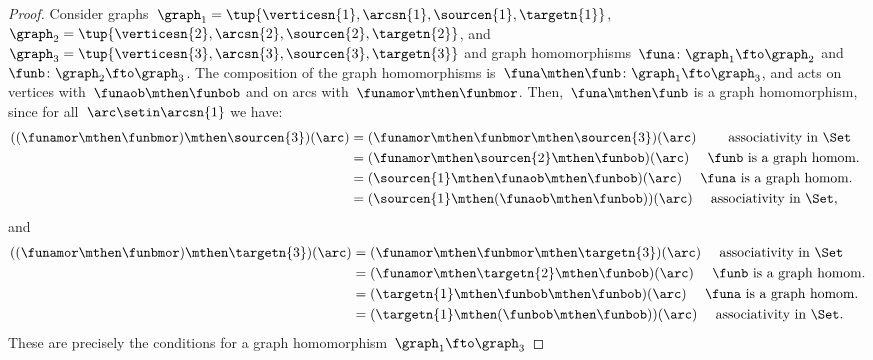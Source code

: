 \begin{proof}
    Consider graphs~$\graph_1=\tup{\verticesn{1},\arcsn{1},\sourcen{1},\targetn{1}}$,~$\graph_2=\tup{\verticesn{2},\arcsn{2},\sourcen{2},\targetn{2}}$, and~$\graph_3=\tup{\verticesn{3},\arcsn{3},\sourcen{3},\targetn{3}}$ and
    graph homomorphisms~$\funa \colon \graph_1 \fto \graph_2$ and~$\funb \colon \graph_2 \fto \graph_3$.
    The composition of the graph homomorphisms is~$\funa\mthen \funb \colon \graph_1 \fto \graph_3$, and acts on vertices with~$\funaob \mthen \funbob$ and on arcs with~$\funamor \mthen \funbmor$.
    Then,~$\funa\mthen \funb$ is a graph homomorphism, since for all~$\arc \setin \arcsn{1}$ we have:
    \begin{equation*}
        \begin{aligned}
            ((\funamor\mthen \funbmor) \mthen \sourcen{3})(\arc) & =(\funamor\mthen \funbmor \mthen \sourcen{3})(\arc) \qquad \text{ associativity in \Set} \\
                                                                 & =(\funamor\mthen \sourcen{2} \mthen \funbob)(\arc) \quad \text{ $\funb$ is a graph homom.
            } \\
                                                                 & =(\sourcen{1} \mthen \funaob\mthen \funbob)(\arc) \quad \text{ $\funa$ is a graph homom.} \\
                                                                 & =(\sourcen{1} \mthen (\funaob\mthen \funbob))(\arc) \quad \text{ associativity in \Set},
        \end{aligned}
    \end{equation*}
    and
    \begin{equation*}
        \begin{aligned}
            ((\funamor \mthen \funbmor) \mthen \targetn{3})(\arc) & =(\funamor \mthen \funbmor \mthen \targetn{3})(\arc) \quad \text{ associativity in \Set} \\
                                                                  & =(\funamor \mthen \targetn{2}\mthen \funbob)(\arc) \quad \text{ $\funb$ is a graph homom.} \\
                                                                  & =(\targetn{1} \mthen \funbob\mthen \funbob)(\arc)\quad \text{ $\funa$ is a graph homom.} \\
                                                                  & =(\targetn{1} \mthen (\funbob\mthen \funbob))(\arc)\quad \text{ associativity in \Set}.
        \end{aligned}
    \end{equation*}
    These are precisely the conditions for a graph homomorphism~$\graph_1 \fto \graph_3$
\end{proof}
